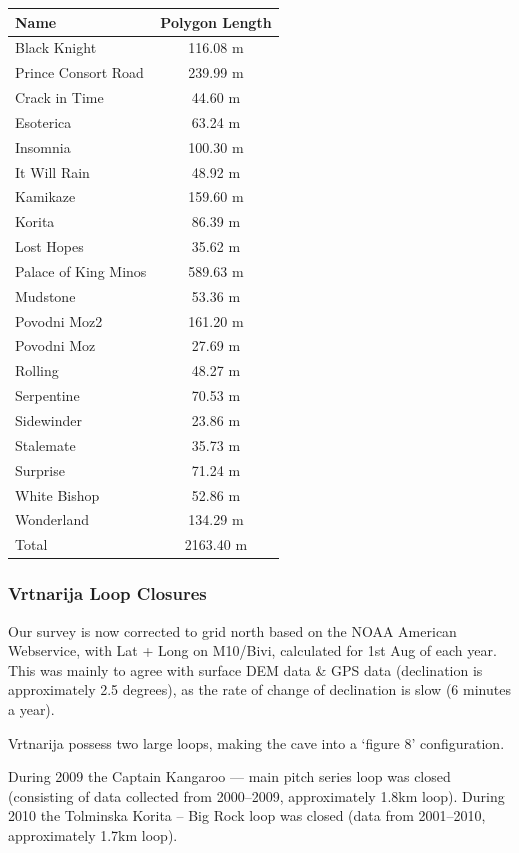 \documentclass[english,a4]{article}
\begin{document}
\begin{tabular}{l c}
Name & Polygon Length \\
\midrule
Black Knight & 116.08 m \\
Prince Consort Road & 239.99 m \\
Crack in Time & 44.60 m \\
Esoterica & 63.24 m \\
Insomnia & 100.30 m \\
It Will Rain & 48.92 m \\
Kamikaze & 159.60 m \\
Korita & 86.39 m \\
Lost Hopes & 35.62 m \\
Palace of King Minos & 589.63 m \\
Mudstone & 53.36 m \\
Povodni Moz2 & 161.20 m \\
Povodni Moz & 27.69 m \\
Rolling & 48.27 m \\
Serpentine & 70.53 m \\
Sidewinder & 23.86 m \\
Stalemate & 35.73 m \\
Surprise & 71.24 m \\
White Bishop & 52.86 m \\
Wonderland & 134.29 m \\
\midrule
Total & 2163.40 m \\
\end{tabular}

\subsubsection{Vrtnarija Loop Closures}

Our survey is now corrected to grid north based on the NOAA American
Webservice, with Lat + Long on M10/Bivi, calculated for 1st Aug of each year.
This was mainly to agree with surface DEM data \& GPS data (declination is
approximately 2.5 degrees), as the rate of change of declination is slow (6
minutes a year).

Vrtnarija possess two large loops, making the cave into a `figure 8' configuration. 

During 2009 the Captain Kangaroo --- main pitch series loop was closed
(consisting of data collected from 2000--2009, approximately 1.8km loop).
During 2010 the Tolminska Korita -- Big Rock loop was closed (data from
2001--2010, approximately 1.7km loop).
\end{document}
